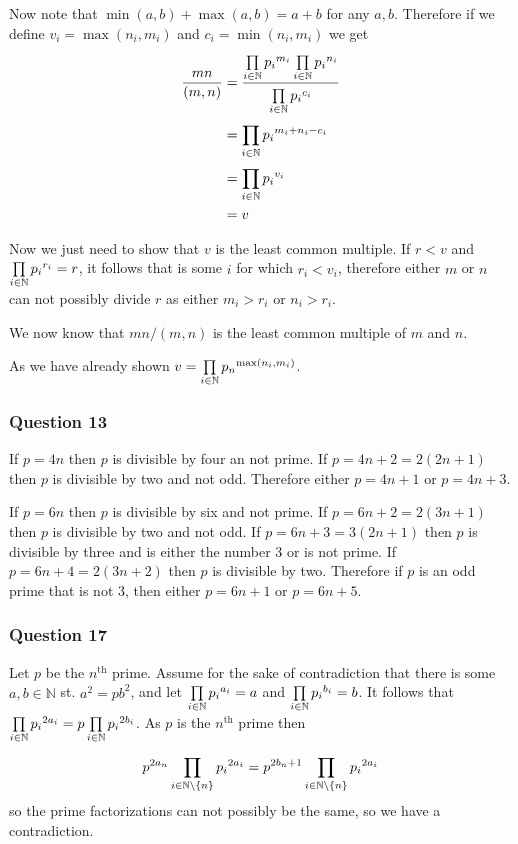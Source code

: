 \documentclass{article}
\begin{document}
Now note that $\min(a,b) + \max(a,b) = a + b$ for any $a,b$. Therefore if we define $v_i = \max(n_i,m_i)$ and $c_i = \min(n_i,m_i)$ we get
\begin{align*}
\frac{mn}{(m,n)} &= \frac{\prod\limits_{{i}\in\mathbb N}^{} {{p_{i}}^{{m}_{i}}}  \prod\limits_{{i}\in\mathbb N}^{} {{p_{i}}^{{n}_{i}}} }{\prod\limits_{{i}\in\mathbb N}^{} {{p_{i}}^{{c}_{i}}} } \\
&= \prod\limits_{i\in\mathbb N}^{} {{p_i}^{m_i+n_i-c_i}}  \\
&= \prod\limits_{{i}\in\mathbb N}^{} {{p_{i}}^{{v}_{i}}}  \\
&= v
\end{align*}

Now we just need to show that $v$ is the least common multiple. If $r < v$ and $\prod\limits_{{i}\in\mathbb N}^{} {{p_{i}}^{{r}_{i}}}  = r$, it follows that is some $i$ for which $r_i < v_i$, therefore either $m$ or $n$ can not possibly divide $r$ as either $m_i > r_i$ or $n_i > r_i$.

We now know that $mn/(m,n)$ is the least common multiple of $m$ and $n$.

 As we have already shown $v = \prod\limits_{i\in\mathbb N}^{} {{p_n}^{\max(n_i,m_i)}} $.

\subsubsection{Question 13}

 If $p = 4n$ then $p$ is divisible by four an not prime. If $p = 4n + 2 = 2(2n + 1)$ then $p$ is divisible by two and not odd. Therefore either $p = 4n+1$ or $p = 4n+3$.

 If $p = 6n$ then $p$ is divisible by six and not prime. If $p = 6n + 2 = 2(3n + 1)$ then $p$ is divisible by two and not odd. If $p = 6n + 3 = 3(2n + 1)$ then $p$ is divisible by three and is either the number 3 or is not prime. If $p = 6n + 4 = 2(3n + 2)$ then $p$ is divisible by two. Therefore if $p$ is an odd prime that is not $3$, then either $p = 6n+1$ or $p = 6n+5$.

\subsubsection{Question 17}

Let $p$ be the $n^{\text{th}}$ prime. Assume for the sake of contradiction that there is some $a,b\in\mathbb N$ st. $a^2=pb^2$, and let $\prod\limits_{{i}\in\mathbb N}^{} {{p_{i}}^{{a}_{i}}}  = a$ and $\prod\limits_{{i}\in\mathbb N}^{} {{p_{i}}^{{b}_{i}}}  = b$. It follows that $\prod\limits_{{i}\in\mathbb N}^{} {{p_{i}}^{{2a}_{i}}} =p\prod\limits_{{i}\in\mathbb N}^{} {{p_{i}}^{{2b}_{i}}} $. As $p$ is the $n^{\text{th}}$ prime then $$p^{2a_n}\prod\limits_{i\in\mathbb N\setminus\left\{ {n} \right\}}^{} {{p_i}^{2a_i}}  = p^{2b_n+1}\prod\limits_{i\in\mathbb N\setminus\left\{ {n} \right\}}^{} {{p_i}^{2a_i}} $$ so the prime factorizations can not possibly be the same, so we have a contradiction.
\end{document}
